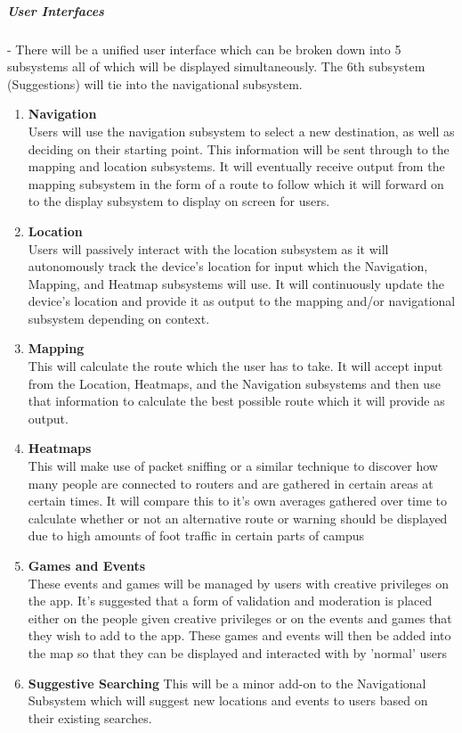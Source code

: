 \documentclass[english]{article}
\begin{document}
					    \subparagraph{User Interfaces}
					     - There will be a unified user interface which can be broken down into 5 subsystems all of which will be displayed simultaneously. The 6th subsystem (Suggestions) will tie into the navigational subsystem.
					    \begin{enumerate}
					        \item \textbf{Navigation}\\
					        Users will use the navigation subsystem to select a new destination, as well as deciding on their starting point. This information will be sent through to the mapping and location subsystems. It will eventually receive output from the mapping subsystem in the form of a route to follow which it will forward on to the display subsystem to display on screen for users.
					        \item \textbf{Location}\\
					        Users will passively interact with the location subsystem as it will autonomously track the device's location for input which the Navigation, Mapping, and Heatmap subsystems will use. It will continuously update the device's location and provide it as output to the mapping and/or navigational subsystem depending on context.
					        \item \textbf{Mapping}\\
					        This will calculate the route which the user has to take. It will accept input from the Location, Heatmaps, and the Navigation subsystems and then use that information to calculate the best possible route which it will provide as output.
					        \item \textbf{Heatmaps}\\
					        This will make use of packet sniffing or a similar technique to discover how many people are connected to routers and are gathered in certain areas at certain times. It will compare this to it's own averages gathered over time to calculate whether or not an alternative route or warning should be displayed due to high amounts of foot traffic in certain parts of campus
					        \item \textbf{Games and Events}\\
					        These events and games will be managed by users with creative privileges on the app. It's suggested that a form of validation and moderation is placed either on the people given creative privileges or on the events and games that they wish to add to the app. These games and events will then be added into the map so that they can be displayed and interacted with by 'normal' users
					        \item \textbf{Suggestive Searching}
					        This will be a minor add-on to the Navigational Subsystem which will suggest new locations and events to users based on their existing searches.
					        
					        
					    \end{enumerate}
\end{document}
